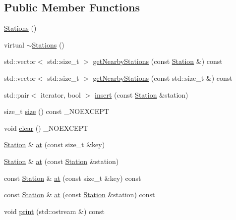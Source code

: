 \subsection*{Public Member Functions}
\begin{DoxyCompactItemize}
\item 
\mbox{\hyperlink{class_stations_a4e0f8fc4709bd680154b7be896ca2350}{Stations}} ()
\item 
virtual \mbox{\hyperlink{class_stations_a9d17c76f77babd7e88adf95112825b1d}{$\sim$\+Stations}} ()
\item 
std\+::vector$<$ std\+::size\+\_\+t $>$ \mbox{\hyperlink{class_stations_ac0438c6c8639d209dfc3937cfd993723}{get\+Nearby\+Stations}} (const \mbox{\hyperlink{class_station}{Station}} \&) const
\item 
std\+::vector$<$ std\+::size\+\_\+t $>$ \mbox{\hyperlink{class_stations_afebcca23df46c02b2d4dfe53da2f03d1}{get\+Nearby\+Stations}} (const std\+::size\+\_\+t \&) const
\item 
std\+::pair$<$ iterator, bool $>$ \mbox{\hyperlink{class_stations_abe1318af7b69c4eb586b099af6a1f6b8}{insert}} (const \mbox{\hyperlink{class_station}{Station}} \&station)
\item 
size\+\_\+t \mbox{\hyperlink{class_stations_ab6e3d3635fffe60f813b1fa7c28e4d8c}{size}} () const \+\_\+\+N\+O\+E\+X\+C\+E\+PT
\item 
void \mbox{\hyperlink{class_stations_ae75fd812e17138fec710fd1e75032239}{clear}} () \+\_\+\+N\+O\+E\+X\+C\+E\+PT
\item 
\mbox{\hyperlink{class_station}{Station}} \& \mbox{\hyperlink{class_stations_a1d2abb378db9aa8deb9f7b54aefac2dd}{at}} (const size\+\_\+t \&key)
\item 
\mbox{\hyperlink{class_station}{Station}} \& \mbox{\hyperlink{class_stations_a0db00fc62fdeebde93f2624477074087}{at}} (const \mbox{\hyperlink{class_station}{Station}} \&station)
\item 
const \mbox{\hyperlink{class_station}{Station}} \& \mbox{\hyperlink{class_stations_ab785e4995153a682ac3fd739b99e8db3}{at}} (const size\+\_\+t \&key) const
\item 
const \mbox{\hyperlink{class_station}{Station}} \& \mbox{\hyperlink{class_stations_a76175b88bafb7de42fae0a5d7518aac9}{at}} (const \mbox{\hyperlink{class_station}{Station}} \&station) const
\item 
void \mbox{\hyperlink{class_stations_ae62b158dedf5f15c385671d15b950dc5}{print}} (std\+::ostream \&) const
\end{DoxyCompactItemize}
